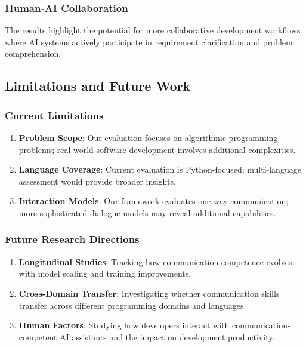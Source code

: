 \documentclass[conference]{IEEEtran}
\begin{document}
\subsubsection{Human-AI Collaboration}

The results highlight the potential for more collaborative development workflows where AI systems actively participate in requirement clarification and problem comprehension.

\subsection{Limitations and Future Work}

\subsubsection{Current Limitations}

\begin{enumerate}
    \item \textbf{Problem Scope}: Our evaluation focuses on algorithmic programming problems; real-world software development involves additional complexities.
    \item \textbf{Language Coverage}: Current evaluation is Python-focused; multi-language assessment would provide broader insights.
    \item \textbf{Interaction Models}: Our framework evaluates one-way communication; more sophisticated dialogue models may reveal additional capabilities.
\end{enumerate}

\subsubsection{Future Research Directions}

\begin{enumerate}
    \item \textbf{Longitudinal Studies}: Tracking how communication competence evolves with model scaling and training improvements.
    \item \textbf{Cross-Domain Transfer}: Investigating whether communication skills transfer across different programming domains and languages.
    \item \textbf{Human Factors}: Studying how developers interact with communication-competent AI assistants and the impact on development productivity.
\end{enumerate}
\end{document}
